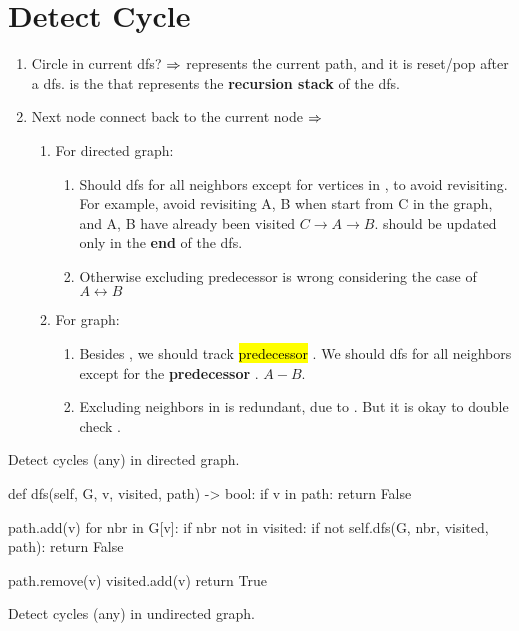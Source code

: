 \section{Detect Cycle}
\begin{enumerate}
\item Circle in current dfs? $\Rightarrow$  represents the current path, and it is reset/pop after a dfs.  is the  that represents the \textbf{recursion stack} of the dfs. 
\item Next node connect back to the current node $\Rightarrow$ 
\begin{enumerate}
\item For directed graph:
\begin{enumerate}
\item Should dfs for all neighbors except for vertices in , to avoid revisiting. For example, avoid revisiting A, B when start from C in the graph, and A, B have already been visited $C \rightarrow A \rightarrow B$.  should be updated only in the \textbf{end} of the dfs.
\item Otherwise excluding predecessor  is wrong considering the case of $A \leftrightarrow B$
\end{enumerate}
\item For  graph:
\begin{enumerate}
\item Besides , we should track \hl{predecessor} . We should dfs for all neighbors except for the \textbf{predecessor} . $A-B$.
\item Excluding neighbors in  is redundant, due to . But it is okay to double check .
\end{enumerate}
\end{enumerate}
\end{enumerate}

Detect cycles (any) in directed graph.

\begin{python}
def dfs(self, G, v, visited, path) -> bool:
  if v in path:
    return False

  path.add(v)
  for nbr in G[v]:
    if nbr not in visited:
      if not self.dfs(G, nbr, visited, path):
        return False

  path.remove(v)
  visited.add(v)
  return True
\end{python}
Detect cycles (any) in undirected graph.

